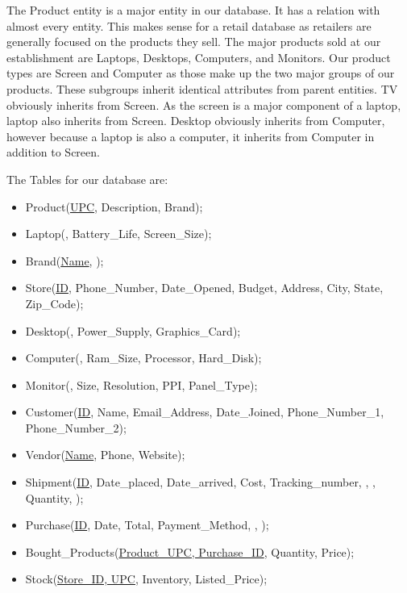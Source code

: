 \documentclass{article}
\begin{document}
    The Product entity is a major entity in our database. It has a relation with
    almost every entity. This makes sense for a retail database as retailers are
    generally focused on the products they sell. The major products sold at our
    establishment are Laptops, Desktops, Computers, and Monitors. Our product
    types are Screen and Computer as those make up the two major groups of our
    products.  These subgroups inherit identical attributes from parent
    entities.  TV obviously inherits from Screen. As the screen is a major
    component of a laptop, laptop also inherits from Screen.  Desktop obviously
    inherits from Computer, however because a laptop is also a computer, it
    inherits from Computer in addition to Screen.

		\noindent 
		The Tables for our database are:
		\begin{itemize}
			\item Product(\underline{UPC}, Description, Brand);
			\item Laptop(, Battery\_Life, Screen\_Size);
      \item Brand(\underline{Name}, );
      \item Store(\underline{ID}, Phone\_Number, Date\_Opened, Budget, Address, City, State, Zip\_Code);
			\item Desktop(, Power\_Supply, Graphics\_Card);
			\item Computer(, Ram\_Size, Processor, Hard\_Disk);
      \item Monitor(, Size, Resolution, PPI, Panel\_Type);
			\item Customer(\underline{ID}, Name, Email\_Address, Date\_Joined, Phone\_Number\_1, Phone\_Number\_2);
			\item Vendor(\underline{Name}, Phone, Website);
      \item Shipment(\underline{ID}, Date\_placed, Date\_arrived, Cost, Tracking\_number,
        , , Quantity, );
      \item Purchase(\underline{ID}, Date, Total, Payment\_Method, , );
      \item Bought\_Products(\underline{Product\_UPC, Purchase\_ID}, Quantity, Price);
      \item Stock(\underline{Store\_ID, UPC}, Inventory, Listed\_Price);
		\end{itemize}
\end{document}
